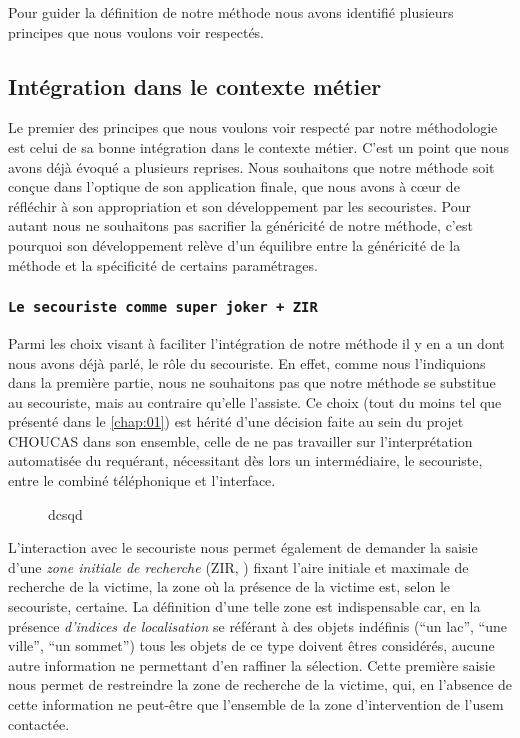 Pour guider la définition de notre méthode nous avons identifié
plusieurs principes que nous voulons voir respectés.

\subsection{Intégration dans le contexte métier}

Le premier des principes que nous voulons voir respecté par notre
méthodologie est celui de sa bonne intégration dans le contexte
métier.
%
C'est un point que nous avons déjà évoqué a plusieurs reprises. Nous
souhaitons que notre méthode soit conçue dans l'optique de son
application finale, \ie que nous avons à cœur de réfléchir à son
appropriation et son développement par les secouristes. Pour autant
nous ne souhaitons pas sacrifier la généricité de notre méthode, c'est
pourquoi son développement relève d'un équilibre entre la généricité
de la méthode et la spécificité de certains paramétrages.

\subsubsection{\texttt{Le secouriste comme super joker + ZIR}}

Parmi les choix visant à faciliter l'intégration de notre méthode il y
en a un dont nous avons déjà parlé, le rôle du secouriste. En effet,
comme nous l'indiquions dans la première partie, nous ne souhaitons
pas que notre méthode se substitue au secouriste, mais au contraire
qu'elle l’assiste. Ce choix (tout du moins tel que présenté dans le
\autoref{chap:01}) est hérité d'une décision faite au sein du projet
CHOUCAS dans son ensemble, celle de ne pas travailler sur
l'interprétation automatisée du requérant, nécessitant dès lors un
intermédiaire, le secouriste, entre le combiné téléphonique et
l'interface.

\begin{figure}
  \centering
  \caption{dcsqd}
  \label{fig:diag_acti_secours}
\end{figure}

L'interaction avec le secouriste nous permet également de demander la
saisie d'une \emph{zone initiale de recherche} (ZIR, \cite{Viry2019})
fixant l'aire initiale et maximale de recherche de la victime, \ie la
zone où la présence de la victime est, selon le secouriste,
certaine. La définition d'une telle zone est indispensable car, en la
présence \emph{d'indices de localisation} se référant à des objets
indéfinis (\eg \enquote{un lac}, \enquote{une ville}, \enquote{un
  sommet}) tous les objets de ce type doivent êtres considérés, aucune
autre information ne permettant d'en raffiner la sélection. Cette
première saisie nous permet de restreindre la zone de recherche de la
victime, qui, en l'absence de cette information ne peut-être que
l'ensemble de la zone d'intervention de l'\ac{usem} contactée.

